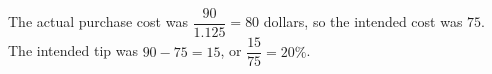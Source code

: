 The actual purchase cost was $\dfrac{90}{1.125}=80$ dollars, so the intended cost was $75$. The intended tip was $90-75=15$, or $\dfrac{15}{75}=\boxed{20\%}$.
